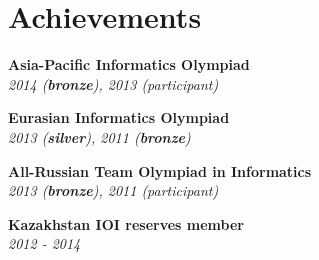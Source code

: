 \documentclass[letterpaper,11pt]{article}
\begin{document}
\section{Achievements}
\parbox[t]{0.45\textwidth}{
    \begin{itemize}[leftmargin=0.15in, label={}]

    \vspace{-12pt}
    \small{\item{
    \textbf{Asia-Pacific Informatics Olympiad} \\
    \textit{2014 (\textbf{bronze}), 2013 (participant)} \\
    }}

    \vspace{-15pt}
    \small{\item{
    \textbf{Eurasian Informatics Olympiad} \\
    \textit{2013 (\textbf{silver}), 2011 (\textbf{bronze})} \\
    }}

    \end{itemize}
}
\parbox[t]{0.45\textwidth}{
    \begin{itemize}[leftmargin=0.15in, label={}]

        \vspace{-12pt}
        \small{\item{
        \textbf{All-Russian Team Olympiad in Informatics} \\
        \textit{2013 (\textbf{bronze}), 2011 (participant)} \\
        }}

        \vspace{-15pt}
        \small{\item{
        \textbf{Kazakhstan IOI reserves member} \\
        \textit{2012 - 2014} \\
        }}

    \end{itemize}
}

\end{document}
